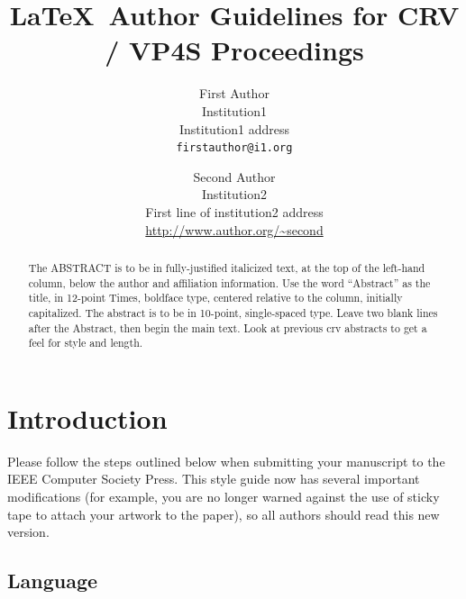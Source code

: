 \documentclass[10pt,twocolumn,letterpaper]{article}
\begin{document}
\title{\LaTeX\ Author Guidelines for CRV / VP4S Proceedings}

\author{First Author\\
Institution1\\
Institution1 address\\
{\tt\small firstauthor@i1.org}
\and
Second Author\\
Institution2\\
First line of institution2 address\\
{\small\url{http://www.author.org/~second}}
}

\maketitle

\begin{abstract}
   The ABSTRACT is to be in fully-justified italicized text, at the top 
   of the left-hand column, below the author and affiliation 
   information. Use the word ``Abstract'' as the title, in 12-point 
   Times, boldface type, centered relative to the column, initially 
   capitalized. The abstract is to be in 10-point, single-spaced type. 
   Leave two blank lines after the Abstract, then begin the main text. 
   Look at previous crv abstracts to get a feel for style and length.
\end{abstract}

\section{Introduction}

Please follow the steps outlined below when submitting your manuscript to
the IEEE Computer Society Press.  This style guide now has several
important modifications (for example, you are no longer warned against the
use of sticky tape to attach your artwork to the paper), so all authors
should read this new version.

\subsection{Language}
\end{document}
